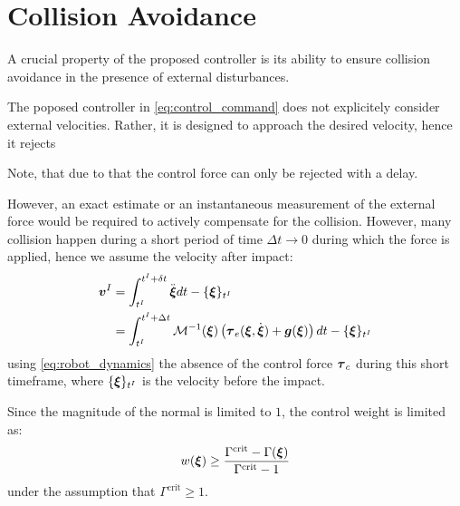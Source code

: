 \section{Collision Avoidance} \label{sec:collision_avoidance}

A crucial property of the proposed controller is its ability to ensure collision avoidance in the presence of external disturbances.

The poposed controller in \eqref{eq:control_command} does not explicitely consider external velocities. Rather, it is designed to approach the desired velocity, hence it rejects 

Note, that due to that the control force can only be rejected with a delay.

However, an exact estimate or an instantaneous measurement of the external force would be required to actively compensate for the collision.
However, many collision happen during a short period of time $\Delta t \rightarrow 0$ during which the force is applied, hence we assume the velocity after impact:
\begin{align}
	\boldsymbol{v}^I 
	 & = \int_{t^I}^{t^I + \delta t} \ddot{\boldsymbol{\xi}} dt - \{ \boldsymbol{\xi} \}_{t^I} \\
	 & = \int_{t^I}^{t^I + \Delta t} \mathcal{M}^{-1}(\boldsymbol{\xi})  \left( \boldsymbol{\tau}_e (\boldsymbol{\xi}, \dot{\boldsymbol{\xi}}) + \boldsymbol{g}(\boldsymbol{\xi}) \right) dt - \{\boldsymbol{\xi} \}_{t^I} \nonumber
\end{align}
using \eqref{eq:robot_dynamics} the absence of the control force $\boldsymbol{\tau}_c$ during this short timeframe, where $\{\boldsymbol{\xi} \}_{t^I}$ is the velocity before the impact.
 
Since the magnitude of the normal is limited to $1$, the control weight is limited as: 
\begin{equation}
w(\boldsymbol{\xi}) \geq \frac{\Gamma^{\mathrm{crit}} - \Gamma(\boldsymbol{\xi})}{\Gamma^{\mathrm{crit}} - 1}
\end{equation}
under the assumption that $\Gamma^{\mathrm{crit}} \geq 1$.

